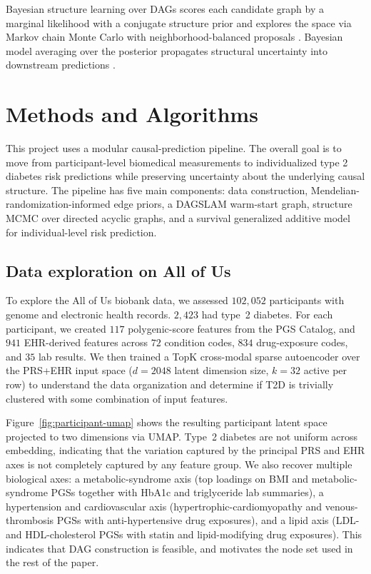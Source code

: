 \documentclass[11pt]{article}
\begin{document}
Bayesian structure learning over DAGs scores each candidate graph by a marginal likelihood with a conjugate structure prior \citep{Geiger2002, Kuipers2014} and explores the space via Markov chain Monte Carlo with neighborhood-balanced proposals \citep{GiudiciCastelo2003, MadiganYork1995}. Bayesian model averaging over the posterior propagates structural uncertainty into downstream predictions \citep{Draper1995}.

\section{Methods and Algorithms}
This project uses a modular causal-prediction pipeline. The overall goal is to move from participant-level biomedical measurements to individualized type 2 diabetes risk predictions while preserving uncertainty about the underlying causal structure. The pipeline has five main components: data construction, Mendelian-randomization-informed edge priors, a DAGSLAM warm-start graph, structure MCMC over directed acyclic graphs, and a survival generalized additive model for individual-level risk prediction.


\subsection{Data exploration on All of Us}
\label{sec:data-exploration}

To explore the All of Us biobank data, we assessed $102{,}052$ participants with genome and electronic health records. $2{,}423$ had type~2 diabetes. For each participant, we created $117$ polygenic-score features from the PGS Catalog, and $941$ EHR-derived features across $72$ condition codes, $834$ drug-exposure codes, and $35$ lab results. We then trained a TopK cross-modal sparse autoencoder over the PRS+EHR input space ($d=2048$ latent dimension size, $k=32$ active per row) to understand the data organization and determine if T2D is trivially clustered with some combination of input features.

Figure~\ref{fig:participant-umap} shows the resulting participant latent space projected to two dimensions via UMAP. Type~2 diabetes are not uniform across embedding, indicating that the variation captured by the principal PRS and EHR axes is not completely captured by any feature group. We also recover multiple biological axes: a metabolic-syndrome axis (top loadings on BMI and metabolic-syndrome PGSs together with HbA1c and triglyceride lab summaries), a hypertension and cardiovascular axis (hypertrophic-cardiomyopathy and venous-thrombosis PGSs with anti-hypertensive drug exposures), and a lipid axis (LDL- and HDL-cholesterol PGSs with statin and lipid-modifying drug exposures). This indicates that DAG construction is feasible, and motivates the node set used in the rest of the paper.
\end{document}
